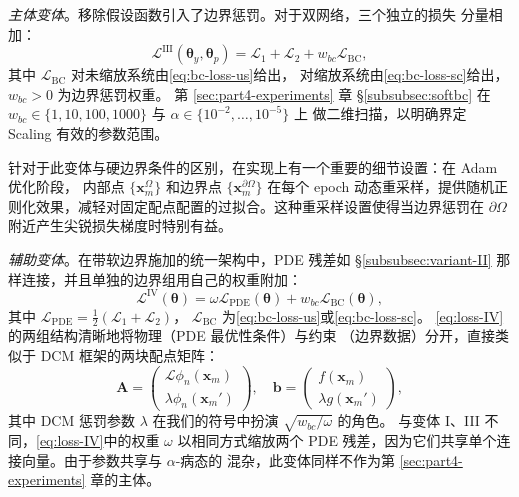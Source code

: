 \documentclass{xmu}
\theoremstyle{plain}
\theoremstyle{remark}
\begin{document}
\label{subsubsec:variant-III}
\emph{主体变体}。移除假设函数引入了边界惩罚。对于双网络，三个独立的损失
分量相加：
\begin{equation}
\boxed{\;\mathcal{L}^{\mathrm{III}}(\boldsymbol{\theta}_y,\boldsymbol{\theta}_p)
= \mathcal{L}_1+\mathcal{L}_2+w_{bc}\mathcal{L}_{\mathrm{BC}},\;}
\label{eq:loss-III}
\end{equation}
其中 $\mathcal{L}_{\mathrm{BC}}$ 对未缩放系统由\eqref{eq:bc-loss-us}给出，
对缩放系统由\eqref{eq:bc-loss-sc}给出，$w_{bc}>0$ 为边界惩罚权重。
第 \ref{sec:part4-experiments} 章 §\ref{subsubsec:softbc} 在
$w_{bc}\in\{1,10,100,1000\}$ 与 $\alpha\in\{10^{-2},\ldots,10^{-5}\}$ 上
做二维扫描，以明确界定 Scaling 有效的参数范围。

针对于此变体与硬边界条件的区别，在实现上有一个重要的细节设置：在 Adam 优化阶段，
内部点 $\{\mathbf{x}_m^\Omega\}$ 和边界点 $\{\mathbf{x}_m^{\partial\Omega}\}$
在每个 epoch 动态重采样，提供随机正则化效果，减轻对固定配点配置的过拟合。这种重采样设置使得当边界惩罚在 $\partial\Omega$ 附近产生尖锐损失梯度时特别有益。

\label{subsubsec:variant-IV}
\emph{辅助变体}。在带软边界施加的统一架构中，PDE 残差如
§\ref{subsubsec:variant-II} 那样连接，并且单独的边界组用自己的权重附加：
\begin{equation}
\boxed{\;\mathcal{L}^{\mathrm{IV}}(\boldsymbol{\theta})
= \omega\mathcal{L}_{\mathrm{PDE}}(\boldsymbol{\theta})
+ w_{bc}\mathcal{L}_{\mathrm{BC}}(\boldsymbol{\theta}),\;}
\label{eq:loss-IV}
\end{equation}
其中 $\mathcal{L}_{\mathrm{PDE}}=\tfrac{1}{2}(\mathcal{L}_1+\mathcal{L}_2)$，
$\mathcal{L}_{\mathrm{BC}}$ 为\eqref{eq:bc-loss-us}或\eqref{eq:bc-loss-sc}。
\eqref{eq:loss-IV}的两组结构清晰地将物理（PDE 最优性条件）与约束
（边界数据）分开，直接类似于 DCM 框架的两块配点矩阵\cite[§2.1]{5}：
\begin{equation}
\mathbf{A}
=\begin{pmatrix}\mathcal{L}\phi_n(\mathbf{x}_m)\\[2pt]\lambda\phi_n(\mathbf{x}_m')\end{pmatrix},\quad
\mathbf{b}
=\begin{pmatrix}f(\mathbf{x}_m)\\[2pt]\lambda g(\mathbf{x}_m')\end{pmatrix},
\end{equation}
其中 DCM 惩罚参数 $\lambda$ 在我们的符号中扮演 $\sqrt{w_{bc}/\omega}$ 的角色。
与变体 I、III 不同，\eqref{eq:loss-IV}中的权重 $\omega$ 以相同方式缩放两个
PDE 残差，因为它们共享单个连接向量。由于参数共享与 $\alpha$-病态的
混杂，此变体同样不作为第 \ref{sec:part4-experiments} 章的主体。
\end{document}
